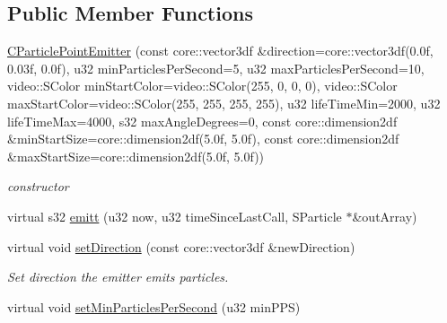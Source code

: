 \subsection*{Public Member Functions}
\begin{DoxyCompactItemize}
\item 
\hypertarget{classirr_1_1scene_1_1_c_particle_point_emitter_a6ff85124a0e4047877062dbd3049e84a}{\hyperlink{classirr_1_1scene_1_1_c_particle_point_emitter_a6ff85124a0e4047877062dbd3049e84a}{C\-Particle\-Point\-Emitter} (const core\-::vector3df \&direction=core\-::vector3df(0.\-0f, 0.\-03f, 0.\-0f), u32 min\-Particles\-Per\-Second=5, u32 max\-Particles\-Per\-Second=10, video\-::\-S\-Color min\-Start\-Color=video\-::\-S\-Color(255, 0, 0, 0), video\-::\-S\-Color max\-Start\-Color=video\-::\-S\-Color(255, 255, 255, 255), u32 life\-Time\-Min=2000, u32 life\-Time\-Max=4000, s32 max\-Angle\-Degrees=0, const core\-::dimension2df \&min\-Start\-Size=core\-::dimension2df(5.\-0f, 5.\-0f), const core\-::dimension2df \&max\-Start\-Size=core\-::dimension2df(5.\-0f, 5.\-0f))}\label{classirr_1_1scene_1_1_c_particle_point_emitter_a6ff85124a0e4047877062dbd3049e84a}

\begin{DoxyCompactList}\small\item\em constructor \end{DoxyCompactList}\item 
virtual s32 \hyperlink{classirr_1_1scene_1_1_c_particle_point_emitter_ab2655265d3173a2d11bfd4d63c265b1e}{emitt} (u32 now, u32 time\-Since\-Last\-Call, S\-Particle $\ast$\&out\-Array)
\item 
\hypertarget{classirr_1_1scene_1_1_c_particle_point_emitter_aa67e96bdca6ad17aaa612277b3b2baf7}{virtual void \hyperlink{classirr_1_1scene_1_1_c_particle_point_emitter_aa67e96bdca6ad17aaa612277b3b2baf7}{set\-Direction} (const core\-::vector3df \&new\-Direction)}\label{classirr_1_1scene_1_1_c_particle_point_emitter_aa67e96bdca6ad17aaa612277b3b2baf7}

\begin{DoxyCompactList}\small\item\em Set direction the emitter emits particles. \end{DoxyCompactList}\item 
\hypertarget{classirr_1_1scene_1_1_c_particle_point_emitter_aa50ca7b5b2a61094006fa7b81e1f5657}{virtual void \hyperlink{classirr_1_1scene_1_1_c_particle_point_emitter_aa50ca7b5b2a61094006fa7b81e1f5657}{set\-Min\-Particles\-Per\-Second} (u32 min\-P\-P\-S)}\label{classirr_1_1scene_1_1_c_particle_point_emitter_aa50ca7b5b2a61094006fa7b81e1f5657}


\end{DoxyCompactItemize}
